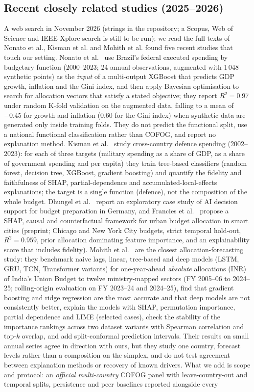 \subsection{Recent closely related studies (2025--2026)}
A web search in November 2026 (strings in the repository; a Scopus, Web of Science and IEEE Xplore search is still to be run); we read the full texts of Nonato et al., Kisman et al. and Mohith et al. found five recent studies that touch our setting. Nonato et al.~\cite{nonato2026} use Brazil's federal executed spending by budgetary function (2000--2023; 24 annual observations, augmented with 1\,048 synthetic points) as the \emph{input} of a multi-output XGBoost that predicts GDP growth, inflation and the Gini index, and then apply Bayesian optimisation to search for allocation vectors that satisfy a stated objective; they report $R^2=0.97$ under random K-fold validation on the augmented data, falling to a mean of $-0.45$ for growth and inflation (0.60 for the Gini index) when synthetic data are generated only inside training folds. They do not predict the functional split, use a national functional classification rather than COFOG, and report no explanation method. Kisman et al.~\cite{kisman2026} study cross-country defence spending (2002--2023): for each of three targets (military spending as a share of GDP, as a share of government spending and per capita) they train tree-based classifiers (random forest, decision tree, XGBoost, gradient boosting) and quantify the fidelity and faithfulness of SHAP, partial-dependence and accumulated-local-effects explanations; the target is a single function (defence), not the composition of the whole budget. Dhungel et al.~\cite{dhungel2025} report an exploratory case study of AI decision support for budget preparation in Germany, and Francies et al.~\cite{francies2026} propose a SHAP, causal and counterfactual framework for urban budget allocation in smart cities (preprint; Chicago and New York City budgets, strict temporal hold-out, $R^2=0.959$, prior allocation dominating feature importance, and an explainability score that includes fidelity). Mohith et al.~\cite{mohith2026} are the closest allocation-forecasting study: they benchmark naive lags, linear, tree-based and deep models (LSTM, GRU, TCN, Transformer variants) for one-year-ahead \emph{absolute} allocations (INR) of India's Union Budget to twelve ministry-mapped sectors (FY 2005--06 to 2024--25; rolling-origin evaluation on FY 2023--24 and 2024--25), find that gradient boosting and ridge regression are the most accurate and that deep models are not consistently better, explain the models with SHAP, permutation importance, partial dependence and LIME (selected cases), check the stability of the importance rankings across two dataset variants with Spearman correlation and top-$k$ overlap, and add split-conformal prediction intervals. Their results on small annual series agree in direction with ours, but they study one country, forecast levels rather than a composition on the simplex, and do not test agreement between explanation methods or recovery of known drivers. What we add is scope and protocol: an \emph{official multi-country} COFOG panel with leave-country-out and temporal splits, persistence and peer baselines reported alongside every 